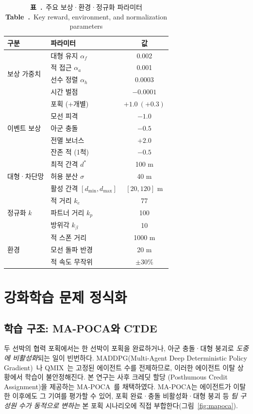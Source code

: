 \documentclass[9pt,twocolumn,a4paper]{extarticle}
\newcommand{\tabcap}[2]{\refstepcounter{table}%
  \caption*{\textbf{표~\thetable.}~#1\\ \textbf{Table~\thetable.}~#2}}
\begin{document}
\begin{table}[t]\centering
\tabcap{주요 보상·환경·정규화 파라미터}{Key reward, environment, and normalization parameters}
\label{tab:param}
\smallskip
\begin{tabular}{|l|l|c|}
\hline
구분 & 파라미터 & 값\\ \hline
\multirow{4}{*}{보상 가중치}
 & 대형 유지 $\alpha_f$ & 0.002\\ \cline{2-3}
 & 적 접근 $\alpha_a$ & 0.001\\ \cline{2-3}
 & 선수 정렬 $\alpha_h$ & 0.0003\\ \cline{2-3}
 & 시간 벌점 & $-0.0001$\\ \hline
\multirow{5}{*}{이벤트 보상}
 & 포획 (+개별) & $+1.0\ (+0.3)$\\ \cline{2-3}
 & 모선 피격 & $-1.0$\\ \cline{2-3}
 & 아군 충돌 & $-0.5$\\ \cline{2-3}
 & 전멸 보너스 & $+2.0$\\ \cline{2-3}
 & 잔존 적 (1척) & $-0.5$\\ \hline
\multirow{3}{*}{대형·차단망}
 & 최적 간격 $d^{*}$ & 100 m\\ \cline{2-3}
 & 허용 분산 $\sigma$ & 40 m\\ \cline{2-3}
 & 활성 간격 $[d_{\min},d_{\max}]$ & $[20,120]$ m\\ \hline
\multirow{3}{*}{정규화 $k$}
 & 적 거리 $k_e$ & 77\\ \cline{2-3}
 & 파트너 거리 $k_p$ & 100\\ \cline{2-3}
 & 방위각 $k_\beta$ & 10\\ \hline
\multirow{3}{*}{환경}
 & 적 스폰 거리 & 1000 m\\ \cline{2-3}
 & 모선 돌파 반경 & 20 m\\ \cline{2-3}
 & 적 속도 무작위 & $\pm30\%$\\ \hline
\end{tabular}
\end{table}

\section{강화학습 문제 정식화}
\subsection{학습 구조: MA-POCA와 CTDE}
두 선박의 협력 포획에서는 한 선박이 포획을 완료하거나, 아군 충돌·대형 붕괴로 \emph{도중에 비활성화}되는 일이
빈번하다. MADDPG(Multi-Agent Deep Deterministic Policy Gradient)~\cite{ref14}나 QMIX~\cite{ref15}는 고정된
에이전트 수를 전제하므로, 이러한 에이전트 이탈 상황에서 학습이 불안정해진다. 본 연구는 사후 크레딧 할당
(Posthumous Credit Assignment)을 제공하는 MA-POCA~\cite{ref13}를 채택하였다. MA-POCA는 에이전트가 이탈한
이후에도 그 기여를 평가할 수 있어, 포획 완료·충돌 비활성화·대형 붕괴 등 \emph{팀 구성원 수가 동적으로 변하는}
본 포획 시나리오에 직접 부합한다(그림~\ref{fig:mapoca}).
\end{document}
